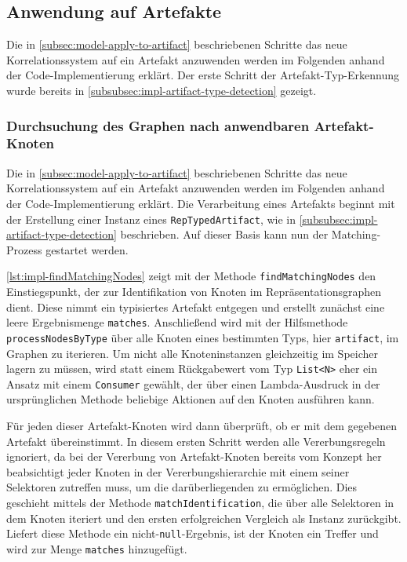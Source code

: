 \subsection{Anwendung auf Artefakte}\label{subsec:impl-apply-to-artifacts}

Die in \autoref{subsec:model-apply-to-artifact} beschriebenen Schritte das neue Korrelationssystem auf ein Artefakt anzuwenden werden im Folgenden anhand der Code-Implementierung erklärt.
Der erste Schritt der Artefakt-Typ-Erkennung wurde bereits in \autoref{subsubsec:impl-artifact-type-detection} gezeigt.

\subsubsection{Durchsuchung des Graphen nach anwendbaren Artefakt-Knoten}

Die in \autoref{subsec:model-apply-to-artifact} beschriebenen Schritte das neue Korrelationssystem auf ein Artefakt anzuwenden werden im Folgenden anhand der Code-Implementierung erklärt.
Die Verarbeitung eines Artefakts beginnt mit der Erstellung einer Instanz eines \texttt{RepTypedArtifact}, wie in \autoref{subsubsec:impl-artifact-type-detection} beschrieben.
Auf dieser Basis kann nun der Matching-Prozess gestartet werden.

\autoref{lst:impl-findMatchingNodes} zeigt mit der Methode \texttt{findMatchingNodes} den Einstiegspunkt, der zur Identifikation von Knoten im Repräsentationsgraphen dient.
Diese nimmt ein typisiertes Artefakt entgegen und erstellt zunächst eine leere Ergebnismenge \texttt{matches}.
Anschließend wird mit der Hilfsmethode \texttt{processNodesByType} über alle Knoten eines bestimmten Typs, hier \texttt{artifact}, im Graphen zu iterieren.
Um nicht alle Knoteninstanzen gleichzeitig im Speicher lagern zu müssen, wird statt einem Rückgabewert vom Typ \texttt{List<N>} eher ein Ansatz mit einem \texttt{Consumer} gewählt, der über einen Lambda-Ausdruck in der ursprünglichen Methode beliebige Aktionen auf den Knoten ausführen kann.

Für jeden dieser Artefakt-Knoten wird dann überprüft, ob er mit dem gegebenen Artefakt übereinstimmt.
In diesem ersten Schritt werden alle Vererbungsregeln ignoriert, da bei der Vererbung von Artefakt-Knoten bereits vom Konzept her beabsichtigt jeder Knoten in der Vererbungshierarchie mit einem seiner Selektoren zutreffen muss, um die darüberliegenden zu ermöglichen.
Dies geschieht mittels der Methode \texttt{matchIdentification}, die über alle Selektoren in dem Knoten iteriert und den ersten erfolgreichen Vergleich als Instanz zurückgibt.
Liefert diese Methode ein nicht-\texttt{null}-Ergebnis, ist der Knoten ein Treffer und wird zur Menge \texttt{matches} hinzugefügt.

